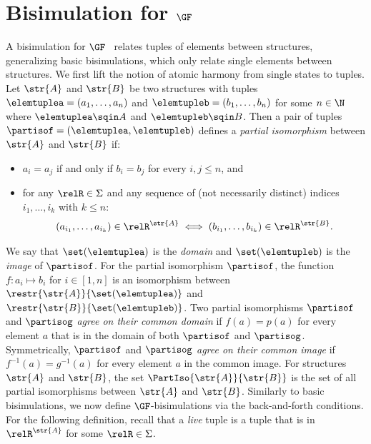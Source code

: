 \section{Bisimulation for $\GF$}
A bisimulation for $\GF$~\cite{AndrekaNB98} relates tuples of elements between structures, generalizing basic bisimulations, which only relate single elements between structures.
We first lift the notion of atomic harmony from single states to tuples.
Let $\str{A}$ and $\str{B}$ be two structures with tuples $\elemtuplea = (a_{1}, \ldots, a_{n})$ and $\elemtupleb = (b_{1}, \ldots, b_{n})$ for some $n \in \N$ where $\elemtuplea \sqin A$ and $\elemtupleb \sqin B$.
Then a pair of tuples $\partisof = (\elemtuplea, \elemtupleb)$ defines a \emph{partial isomorphism} between $\str{A}$ and $\str{B}$ if:
\begin{itemize}
  \item $a_{i} = a_{j}$ if and only if $b_{i} = b_{j}$ for every $i,j \le n$, and
  \item for any $\relR \in \Sigma$ and any sequence of (not necessarily distinct) indices $i_{1}, \ldots, i_{k}$ with $k \le n$:
    \begin{equation*}
    (a_{i_{1}}, \ldots, a_{i_{k}}) \in \relR^{\str{A}} \iff (b_{i_{1}}, \ldots, b_{i_{k}}) \in \relR^{\str{B}}\mathrm{.}
    \end{equation*}
\end{itemize}
We say that $\set(\elemtuplea)$ is the \emph{domain} and $\set(\elemtupleb)$ is the \emph{image} of $\partisof$.
For the partial isomorphism $\partisof$, the function $f \colon a_{i} \mapsto b_{i}$ for $i \in [1,n]$ is an isomorphism between $\restr{\str{A}}{\set(\elemtuplea)}$ and $\restr{\str{B}}{\set(\elemtupleb)}$.
Two partial isomorphisms $\partisof$ and $\partisog$ \emph{agree on their common domain} if $f(a) = p(a)$ for every element $a$ that is in the domain of both $\partisof$ and $\partisog$.
Symmetrically, $\partisof$ and $\partisog$ \emph{agree on their common image} if $f^{-1}(a) = g^{-1}(a)$ for every element $a$ in the common image.
For structures $\str{A}$ and $\str{B}$, the set $\PartIso{\str{A}}{\str{B}}$ is the set of all partial isomorphisms between $\str{A}$ and $\str{B}$. Similarly to basic bisimulations, we now define $\GF$-bisimulations via the back-and-forth conditions. For the following definition, recall that a \emph{live} tuple is a tuple that is in $\relR^{\str{A}}$ for some $\relR \in \Sigma$.
